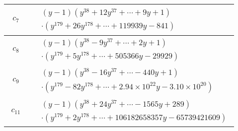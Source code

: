 \documentclass[1p]{elsarticle_modified}
\theoremstyle{definition}
\begin{document}
\begin{tabular}{m{50pt}|m{274pt}}
\hline $$\begin{aligned}c_{7}\end{aligned}$$&$\begin{aligned}
&(y-1)(y^{38}+12 y^{37}+\cdots+9 y+1)\\
&\cdot(y^{179}+26 y^{178}+\cdots+119939 y-841)
\end{aligned}$\\
\hline $$\begin{aligned}c_{8}\end{aligned}$$&$\begin{aligned}
&(y-1)(y^{38}-9 y^{37}+\cdots+2 y+1)\\
&\cdot(y^{179}+5 y^{178}+\cdots+505366 y-29929)
\end{aligned}$\\
\hline $$\begin{aligned}c_{9}\end{aligned}$$&$\begin{aligned}
&(y-1)(y^{38}-16 y^{37}+\cdots-440 y+1)\\
&\cdot(y^{179}-82 y^{178}+\cdots+2.94\times10^{22} y-3.10\times10^{20})
\end{aligned}$\\
\hline $$\begin{aligned}c_{11}\end{aligned}$$&$\begin{aligned}
&(y-1)(y^{38}+24 y^{37}+\cdots-1565 y+289)\\
&\cdot(y^{179}+2 y^{178}+\cdots+106182658357 y-65739421609)
\end{aligned}$\\
\hline
\end{tabular}
\vskip 2pc
\end{document}
